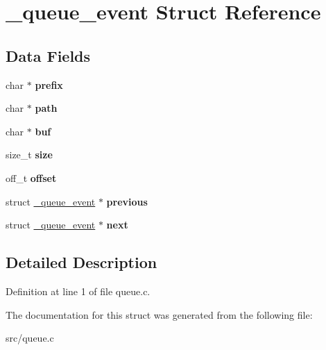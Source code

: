 \hypertarget{struct__queue__event}{\section{\-\_\-queue\-\_\-event \-Struct \-Reference}
\label{struct__queue__event}
}
\subsection*{\-Data \-Fields}
\begin{DoxyCompactItemize}
\item 
\hypertarget{struct__queue__event_a840890259799e31a81a600e170a04040}{char $\ast$ {\bfseries prefix}}\label{struct__queue__event_a840890259799e31a81a600e170a04040}

\item 
\hypertarget{struct__queue__event_ab42f28bb5b475e365a83c36c3e5aa077}{char $\ast$ {\bfseries path}}\label{struct__queue__event_ab42f28bb5b475e365a83c36c3e5aa077}

\item 
\hypertarget{struct__queue__event_a9ae9cfa7e62bff88b588dab57923c85f}{char $\ast$ {\bfseries buf}}\label{struct__queue__event_a9ae9cfa7e62bff88b588dab57923c85f}

\item 
\hypertarget{struct__queue__event_a8d0a1e24e958042d0f33b38baa1d54c6}{size\-\_\-t {\bfseries size}}\label{struct__queue__event_a8d0a1e24e958042d0f33b38baa1d54c6}

\item 
\hypertarget{struct__queue__event_a6f5c23fc61c36753cbaf9bb5d799dd07}{off\-\_\-t {\bfseries offset}}\label{struct__queue__event_a6f5c23fc61c36753cbaf9bb5d799dd07}

\item 
\hypertarget{struct__queue__event_a0d4ae8e934b8d10df43236715641d90d}{struct \hyperlink{struct__queue__event}{\-\_\-queue\-\_\-event} $\ast$ {\bfseries previous}}\label{struct__queue__event_a0d4ae8e934b8d10df43236715641d90d}

\item 
\hypertarget{struct__queue__event_a00345ecb26caedbfbdf5414f17f93267}{struct \hyperlink{struct__queue__event}{\-\_\-queue\-\_\-event} $\ast$ {\bfseries next}}\label{struct__queue__event_a00345ecb26caedbfbdf5414f17f93267}

\end{DoxyCompactItemize}


\subsection{\-Detailed \-Description}


\-Definition at line 1 of file queue.\-c.



\-The documentation for this struct was generated from the following file\-:\begin{DoxyCompactItemize}
\item 
src/queue.\-c\end{DoxyCompactItemize}
